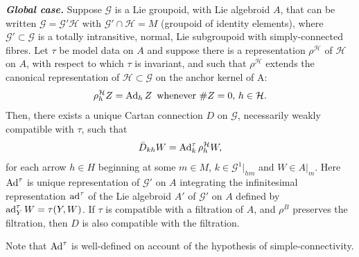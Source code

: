 \documentclass[leqno,12pt]{amsart} %
\begin{document}
\begin{proposition}
  {\em \bfseries\em Global case.} Suppose ${\mathcal G} $ is a Lie groupoid, with Lie
  algebroid $A$, that can be written ${\mathcal G} = {\mathcal G}' {\mathcal H} $ with
  ${\mathcal G}'\cap {\mathcal H} = M$ (groupoid of identity elements), where
  ${\mathcal G}' \subset {\mathcal G} $ is a totally intransitive, normal, Lie subgroupoid
  with simply-connected fibres. Let $\tau $ be model data on $A$ and suppose there is a
  representation $\rho^{\mathcal H}$ of ${\mathcal H} $ on $A$, with respect to which
  $\tau $ is invariant, and such that $\rho^{\mathcal H}$ extends the canonical
  representation of ${\mathcal H} \subset {\mathcal G} $ on the anchor kernel of A:
  \begin{equation}
    \label{pony4}
    \rho^{\mathcal H}_hZ = \operatorname{Ad}_h Z  \enspace
      \text{whenever $\#Z=0$, $h \in {\mathcal H}$}.
  \end{equation}
  Then, there exists a unique Cartan connection $D $ on ${\mathcal G}$, necessarily
  weakly compatible with $\tau $, such that
  \begin{equation}
    \bar D_{kh}W = \operatorname{Ad}^\tau_k \rho^{\mathcal H}_hW,\label{ext17}
  \end{equation}
  for each arrow $h \in H$ beginning at some $m \in M$, $k \in {\mathcal G}^1|_{hm}$ and
  $W \in A|_m$. Here $\operatorname{Ad}^\tau$ is unique representation of ${\mathcal G}'$ on $A$
  integrating the infinitesimal representation $\operatorname{ad}^\tau$ of the Lie algebroid $A'$
  of ${\mathcal G} '$ on $A$ defined by $\operatorname{ad}^\tau_YW=\tau(Y, W)$.  If $\tau $ is
  compatible with a filtration of $A$, and $\rho^B$ preserves the filtration, then $D$ is
  also compatible with the filtration.
\end{proposition}
\noindent%
Note that $\operatorname{Ad}^\tau$ is well-defined on account of the hypothesis of
simple-connectivity.
\end{document}
